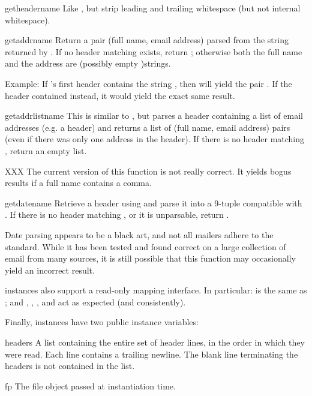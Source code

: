 \begin{funcdesc}{getheader}{name}
Like , but strip leading and trailing
whitespace (but not internal whitespace).
\end{funcdesc}

\begin{funcdesc}{getaddr}{name}
Return a pair (full name, email address) parsed from the string
returned by .  If no header matching
 exists, return ; otherwise both the full
name and the address are (possibly empty )strings.

Example: If 's first  header contains the string
, then
 will yield the pair
.
If the header contained
 instead, it would yield the
exact same result.
\end{funcdesc}

\begin{funcdesc}{getaddrlist}{name}
This is similar to , but parses a header
containing a list of email addresses (e.g. a  header) and
returns a list of (full name, email address) pairs (even if there was
only one address in the header).  If there is no header matching
, return an empty list.

XXX The current version of this function is not really correct.  It
yields bogus results if a full name contains a comma.
\end{funcdesc}

\begin{funcdesc}{getdate}{name}
Retrieve a header using  and parse it into a 9-tuple
compatible with .  If there is no header matching
, or it is unparsable, return .

Date parsing appears to be a black art, and not all mailers adhere to
the standard.  While it has been tested and found correct on a large
collection of email from many sources, it is still possible that this
function may occasionally yield an incorrect result.
\end{funcdesc}

 instances also support a read-only mapping interface.
In particular:  is the same as ;
and , , ,
 and  act as expected (and
consistently).

Finally,  instances have two public instance variables:

\begin{datadesc}{headers}
A list containing the entire set of header lines, in the order in
which they were read.  Each line contains a trailing newline.  The
blank line terminating the headers is not contained in the list.
\end{datadesc}

\begin{datadesc}{fp}
The file object passed at instantiation time.
\end{datadesc}
